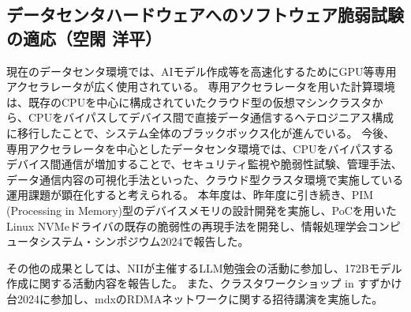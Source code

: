 \subsection{データセンタハードウェアへのソフトウェア脆弱試験の適応（空閑 洋平）}

現在のデータセンタ環境では、AIモデル作成等を高速化するためにGPU等専用アクセラレータが広く使用されている。
専用アクセラレータを用いた計算環境は、既存のCPUを中心に構成されていたクラウド型の仮想マシンクラスタから、CPUをバイパスしてデバイス間で直接データ通信するヘテロジニアス構成に移行したことで、システム全体のブラックボックス化が進んでいる。
今後、専用アクセラレータを中心としたデータセンタ環境では、CPUをバイパスするデバイス間通信が増加することで、セキュリティ監視や脆弱性試験、管理手法、データ通信内容の可視化手法といった、クラウド型クラスタ環境で実施している運用課題が顕在化すると考えられる。
本年度は、昨年度に引き続き、PIM (Processing in Memory)型のデバイスメモリの設計開発を実施し、PoCを用いたLinux NVMeドライバの既存の脆弱性の再現手法を開発し、情報処理学会コンピュータシステム・シンポジウム2024で報告した\cite{ykuga4301xyyyy}。

その他の成果としては、NIIが主催するLLM勉強会の活動に参加し、172Bモデル作成に関する活動内容を報告した\cite{ykuga4301yyyyy}。
また、クラスタワークショップ in すずかけ台2024に参加し、mdxのRDMAネットワークに関する招待講演を実施した\cite{ykuga458xxxxx}。
